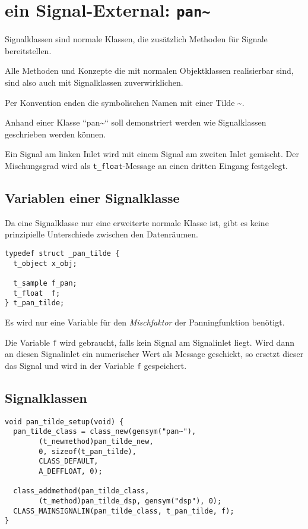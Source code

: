 \documentclass[12pt, a4paper,austrian, titlepage]{article}
\begin{document}
\section{ein Signal-External: {\tt pan\~\/}}
Signalklassen sind normale Klassen, die zusätzlich Methoden
für Signale bereitstellen.

Alle Methoden und Konzepte die mit normalen Objektklassen realisierbar sind,
sind also auch mit Signalklassen zuverwirklichen.

Per Konvention enden die symbolischen Namen mit einer Tilde \~\/.

Anhand einer Klasse ``pan\~\/`` soll demonstriert werden wie Signalklassen geschrieben
werden können.

Ein Signal am linken Inlet wird mit einem Signal am zweiten Inlet gemischt.
Der Mischungsgrad wird als \verb+t_float+-Message an einen dritten Eingang festgelegt.

\subsection{Variablen einer Signalklasse}
Da eine Signalklasse nur eine erweiterte normale Klasse ist,
gibt es keine prinzipielle Unterschiede zwischen den Datenräumen.

\begin{verbatim}
typedef struct _pan_tilde {
  t_object x_obj;

  t_sample f_pan;
  t_float  f;
} t_pan_tilde;
\end{verbatim}

Es wird nur eine Variable für den {\em Mischfaktor} der Panningfunktion benötigt.

Die Variable \verb+f+ wird gebraucht, falls kein Signal am Signalinlet liegt.
Wird dann an diesen Signalinlet ein numerischer Wert als Message geschickt,
so ersetzt dieser das Signal und wird in der Variable \verb+f+ gespeichert.

\subsection{Signalklassen}

\begin{verbatim}
void pan_tilde_setup(void) {
  pan_tilde_class = class_new(gensym("pan~"),
        (t_newmethod)pan_tilde_new,
        0, sizeof(t_pan_tilde),
        CLASS_DEFAULT, 
        A_DEFFLOAT, 0);

  class_addmethod(pan_tilde_class,
        (t_method)pan_tilde_dsp, gensym("dsp"), 0);
  CLASS_MAINSIGNALIN(pan_tilde_class, t_pan_tilde, f);
}
\end{verbatim}
\end{document}

